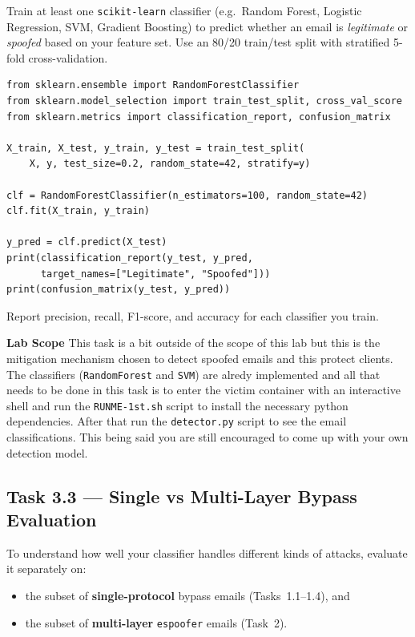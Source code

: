 \documentclass[11pt]{article}
\begin{document}
Train at least one \texttt{scikit-learn} classifier (e.g.\ Random
Forest, Logistic Regression, SVM, Gradient Boosting) to predict whether
an email is \emph{legitimate} or \emph{spoofed} based on your feature
set.
Use an 80/20 train/test split with stratified 5-fold cross-validation.

\begin{listing}[H]
\begin{verbatim}
from sklearn.ensemble import RandomForestClassifier
from sklearn.model_selection import train_test_split, cross_val_score
from sklearn.metrics import classification_report, confusion_matrix

X_train, X_test, y_train, y_test = train_test_split(
    X, y, test_size=0.2, random_state=42, stratify=y)

clf = RandomForestClassifier(n_estimators=100, random_state=42)
clf.fit(X_train, y_train)

y_pred = clf.predict(X_test)
print(classification_report(y_test, y_pred,
      target_names=["Legitimate", "Spoofed"]))
print(confusion_matrix(y_test, y_pred))
\end{verbatim}
\end{listing}
\vspace{-20pt}
Report precision, recall, F1-score, and accuracy for each classifier
you train.
\vspace{5pt}
\begin{notebox}
\textbf{Lab Scope} This task is a bit outside of the scope of this lab but this is the mitigation mechanism chosen to detect spoofed emails and this protect clients.
The classifiers (\texttt{RandomForest} and \texttt{SVM}) are alredy implemented and all that needs to be done in this task is to enter the victim container with an interactive shell and run the \texttt{RUNME-1st.sh} script to install the necessary python dependencies. After that run the \texttt{detector.py} script to see the email classifications.
This being said you are still encouraged to come up with your own detection model.
\end{notebox}

\subsection{Task 3.3 --- Single vs Multi-Layer Bypass Evaluation}

To understand how well your classifier handles different kinds of
attacks, evaluate it separately on:
\begin{itemize}[noitemsep]
  \item the subset of \textbf{single-protocol} bypass emails
        (Tasks~1.1--1.4), and
  \item the subset of \textbf{multi-layer} \texttt{espoofer} emails
        (Task~2).
\end{itemize}
\end{document}
